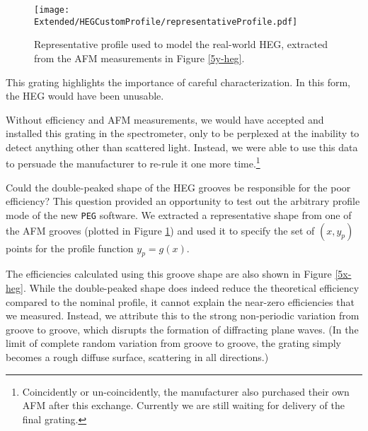 \begin{figure}[htbp] %
   \centering
   \texttt{[image: Extended/HEGCustomProfile/representativeProfile.pdf]} 
   \caption{Representative profile used to model the real-world HEG, extracted from the AFM measurements in Figure \ref{5y-heg}.}
   \label{hegRepresentativeGroove}
\end{figure}

This grating highlights the importance of careful characterization.  In this form, the HEG would have been unusable.

Without efficiency and AFM measurements, we would have accepted and installed this grating in the spectrometer, only to be perplexed at the inability to detect anything other than scattered light.   Instead, we were able to use this data to persuade the manufacturer to re-rule it one more time.\footnote{Coincidently or un-coincidently, the manufacturer also purchased their own AFM after this exchange.  Currently we are still waiting for delivery of the final grating.}

Could the double-peaked shape of the HEG grooves be responsible for the poor efficiency?  This question provided an opportunity to test out the arbitrary profile mode of the new \texttt{PEG} software.  We extracted a representative shape from one of the AFM grooves (plotted in Figure \ref{hegRepresentativeGroove}) and used it to specify the set of $(x,y_p)$ points for the profile function $y_p = g(x)$.

The efficiencies calculated using this groove shape are also shown in Figure \ref{5x-heg}.  While the double-peaked shape does indeed reduce the theoretical efficiency compared to the nominal profile, it cannot explain the near-zero efficiencies that we measured.  Instead, we attribute this to the strong non-periodic variation from groove to groove, which disrupts the formation of diffracting plane waves.  (In the limit of complete random variation from groove to groove, the grating simply becomes a rough diffuse surface, scattering in all directions.)

